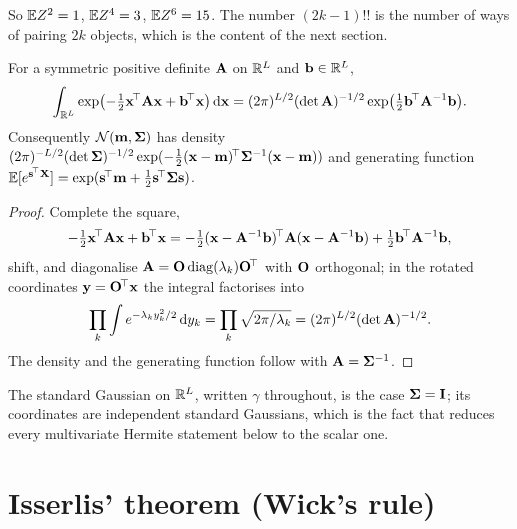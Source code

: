 So $\mathbb{E} Z^2=1$, $\mathbb{E} Z^4=3$, $\mathbb{E} Z^6=15$. The number $(2k-1)!!$ is the number of ways of
pairing $2k$ objects, which is the content of the next section.

\begin{lemma}
\label{lem:gauss-multi}
For a symmetric positive definite $\mathbf{A}$ on $\mathbb{R}^{L}$ and $\mathbf{b}\in\mathbb{R}^{L}$,
\begin{equation}
  \int_{\mathbb{R}^{L}}\exp\bigl(-\tfrac12\mathbf{x}^{\!\top}\mathbf{A}\mathbf{x}+\mathbf{b}^{\!\top}\mathbf{x}\bigr)\,\mathrm{d}\mathbf{x}
  =(2\pi)^{L/2}(\det\mathbf{A})^{-1/2}\exp\bigl(\tfrac12\mathbf{b}^{\!\top}\mathbf{A}^{-1}\mathbf{b}\bigr).
  \label{eq:gauss-multi}
\end{equation}
Consequently $\mathcal{N}\!\left(\mathbf{m},\mathbf{\Sigma}\right)$ has density
$(2\pi)^{-L/2}(\det\mathbf{\Sigma})^{-1/2}\exp(-\tfrac12(\mathbf{x}-\mathbf{m})^{\!\top}\mathbf{\Sigma}^{-1}(\mathbf{x}-\mathbf{m}))$
and generating function $\mathbb{E}[e^{\mathbf{s}^{\!\top}\mathbf{X}}]=\exp(\mathbf{s}^{\!\top}\mathbf{m}+\tfrac12\mathbf{s}^{\!\top}\mathbf{\Sigma}\mathbf{s})$.
\end{lemma}
\begin{proof}
Complete the square,
\[
  -\tfrac12\mathbf{x}^{\!\top}\mathbf{A}\mathbf{x}+\mathbf{b}^{\!\top}\mathbf{x}
  =-\tfrac12(\mathbf{x}-\mathbf{A}^{-1}\mathbf{b})^{\!\top}\mathbf{A}(\mathbf{x}-\mathbf{A}^{-1}\mathbf{b})+\tfrac12\mathbf{b}^{\!\top}\mathbf{A}^{-1}\mathbf{b},
\]
shift, and diagonalise $\mathbf{A}=\mathbf{O}\operatorname{diag}(\lambda_k)\mathbf{O}^{\!\top}$ with $\mathbf{O}$ orthogonal;
in the rotated coordinates $\mathbf{y}=\mathbf{O}^{\!\top}\mathbf{x}$ the integral factorises into
\[
  \prod_k\int e^{-\lambda_ky_k^2/2}\,\mathrm{d} y_k=\prod_k\sqrt{2\pi/\lambda_k}=(2\pi)^{L/2}(\det\mathbf{A})^{-1/2}.
\]
The density and the generating function follow with $\mathbf{A}=\mathbf{\Sigma}^{-1}$.
\end{proof}

The standard Gaussian on $\mathbb{R}^{L}$, written $\gamma$ throughout, is the case
$\mathbf{\Sigma}=\mathbf{I}$; its coordinates are independent standard Gaussians, which is the fact
that reduces every multivariate Hermite statement below to the scalar one.

\section{Isserlis' theorem (Wick's rule)}

